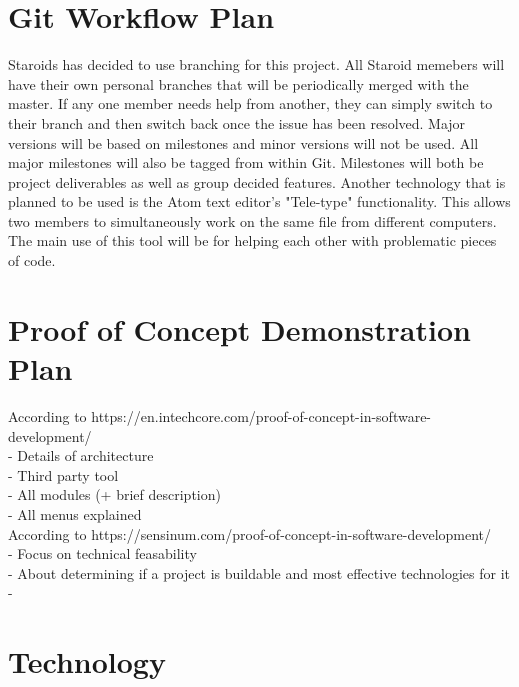 \documentclass{article}
\begin{document}
\section{Git Workflow Plan}
Staroids has decided to use branching for this project. All Staroid memebers will have their own personal branches that will be periodically merged with the master. If any one member needs help from another, they can simply switch to their branch and then switch back once the issue has been resolved. Major versions will be based on milestones and minor versions will not be used. All major milestones will also be tagged from within Git. Milestones will both be project deliverables as well as group decided features. Another technology that is planned to be used is the Atom text editor's "Tele-type" functionality. This allows two members to simultaneously work on the same file from different computers. The main use of this tool will be for helping each other with problematic pieces of code.\\

\section{Proof of Concept Demonstration Plan}

According to https://en.intechcore.com/proof-of-concept-in-software-development/\\
- Details of architecture\\
- Third party tool\\
- All modules (+ brief description)\\
- All menus explained\\

According to https://sensinum.com/proof-of-concept-in-software-development/\\
- Focus on technical feasability\\
- About determining if a project is buildable and most effective technologies for it\\
-

\section{Technology}
\end{document}
